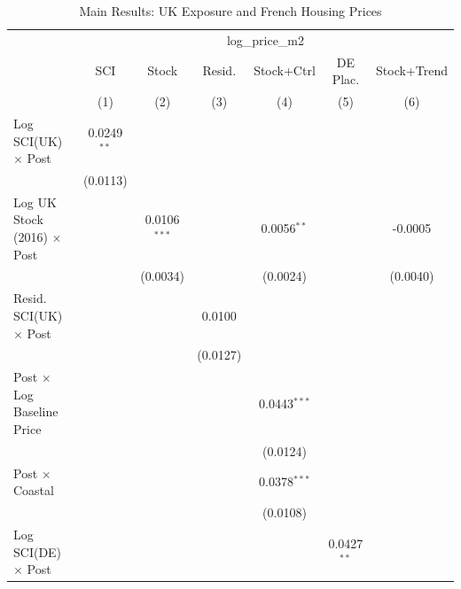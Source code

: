 
\begin{table}[htbp]
   \caption{\label{tab:main} Main Results: UK Exposure and French Housing Prices}
   \bigskip
   \centering
   \begin{tabular}{lcccccc}
      \toprule
       & \multicolumn{6}{c}{log\_price\_m2}\\
                                             & SCI           & Stock          & Resid.        & Stock+Ctrl     & DE Plac.      & Stock+Trend \\   
                                             & (1)           & (2)            & (3)           & (4)            & (5)           & (6)\\  
      \midrule 
      Log SCI(UK) $\times$ Post              & 0.0249$^{**}$ &                &               &                &               &   \\   
                                             & (0.0113)      &                &               &                &               &   \\   
      Log UK Stock (2016) $\times$ Post      &               & 0.0106$^{***}$ &               & 0.0056$^{**}$  &               & -0.0005\\   
                                             &               & (0.0034)       &               & (0.0024)       &               & (0.0040)\\   
      Resid. SCI(UK) $\times$ Post           &               &                & 0.0100        &                &               &   \\   
                                             &               &                & (0.0127)      &                &               &   \\   
      Post $\times$ Log Baseline Price       &               &                &               & 0.0443$^{***}$ &               &   \\   
                                             &               &                &               & (0.0124)       &               &   \\   
      Post $\times$ Coastal                  &               &                &               & 0.0378$^{***}$ &               &   \\   
                                             &               &                &               & (0.0108)       &               &   \\   
      Log SCI(DE) $\times$ Post              &               &                &               &                & 0.0427$^{**}$ &   \\   

\end{tabular}
\end{table}
